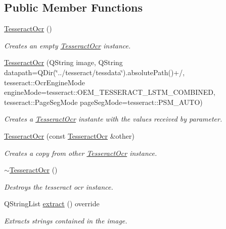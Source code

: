 \subsection*{Public Member Functions}
\begin{DoxyCompactItemize}
\item 
\mbox{\hyperlink{classTesseractOcr_a9e62c15a4f8e4c8a0a614cf04ec8dea6}{Tesseract\+Ocr}} ()
\begin{DoxyCompactList}\small\item\em Creates an empty \mbox{\hyperlink{classTesseractOcr}{Tesseract\+Ocr}} instance. \end{DoxyCompactList}\item 
\mbox{\hyperlink{classTesseractOcr_ad550fd8468a1b1ee0b915c7202281dc7}{Tesseract\+Ocr}} (Q\+String image, Q\+String datapath=Q\+Dir(\char`\"{}../tesseract/tessdata\char`\"{}).absolute\+Path()+\textquotesingle{}/\textquotesingle{}, tesseract\+::\+Ocr\+Engine\+Mode engine\+Mode=tesseract\+::\+O\+E\+M\+\_\+\+T\+E\+S\+S\+E\+R\+A\+C\+T\+\_\+\+L\+S\+T\+M\+\_\+\+C\+O\+M\+B\+I\+N\+ED, tesseract\+::\+Page\+Seg\+Mode page\+Seg\+Mode=tesseract\+::\+P\+S\+M\+\_\+\+A\+U\+TO)
\begin{DoxyCompactList}\small\item\em Creates a \mbox{\hyperlink{classTesseractOcr}{Tesseract\+Ocr}} instante with the values received by parameter. \end{DoxyCompactList}\item 
\mbox{\hyperlink{classTesseractOcr_a8cac9f702b0eb765b522375d4aae08e9}{Tesseract\+Ocr}} (const \mbox{\hyperlink{classTesseractOcr}{Tesseract\+Ocr}} \&other)
\begin{DoxyCompactList}\small\item\em Creates a copy from other \mbox{\hyperlink{classTesseractOcr}{Tesseract\+Ocr}} instance. \end{DoxyCompactList}\item 
\mbox{\label{classTesseractOcr_ad7d20b699dec0f1939c58eb0cc952406}} 
\mbox{\hyperlink{classTesseractOcr_ad7d20b699dec0f1939c58eb0cc952406}{$\sim$\+Tesseract\+Ocr}} ()
\begin{DoxyCompactList}\small\item\em Destroys the tesseract ocr instance. \end{DoxyCompactList}\item 
Q\+String\+List \mbox{\hyperlink{classTesseractOcr_a7e5a1d3e275f710ce187bc1c0b080327}{extract}} () override
\begin{DoxyCompactList}\small\item\em Extracts strings contained in the image. \end{DoxyCompactList}\item 

\end{DoxyCompactItemize}
